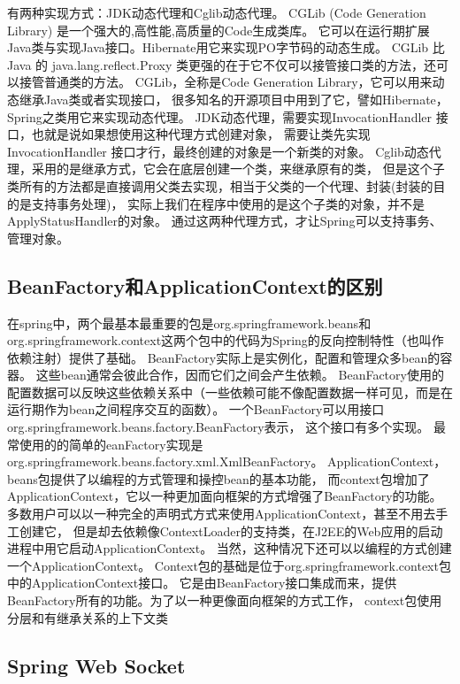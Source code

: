 \documentclass{book}
\begin{document}
有两种实现方式：JDK动态代理和Cglib动态代理。
CGLib (Code Generation Library) 是一个强大的,高性能,高质量的Code生成类库。
它可以在运行期扩展Java类与实现Java接口。Hibernate用它来实现PO字节码的动态生成。
CGLib 比 Java 的 java.lang.reflect.Proxy 类更强的在于它不仅可以接管接口类的方法，还可以接管普通类的方法。
CGLib，全称是Code Generation Library，它可以用来动态继承Java类或者实现接口，
很多知名的开源项目中用到了它，譬如Hibernate，Spring之类用它来实现动态代理。
JDK动态代理，需要实现InvocationHandler 接口，也就是说如果想使用这种代理方式创建对象，
需要让类先实现InvocationHandler 接口才行，最终创建的对象是一个新类的对象。
Cglib动态代理，采用的是继承方式，它会在底层创建一个类，来继承原有的类，
但是这个子类所有的方法都是直接调用父类去实现，相当于父类的一个代理、封装(封装的目的是支持事务处理)，
实际上我们在程序中使用的是这个子类的对象，并不是ApplyStatusHandler的对象。
通过这两种代理方式，才让Spring可以支持事务、管理对象。

\subsection{BeanFactory和ApplicationContext的区别}

在spring中，两个最基本最重要的包是org.springframework.beans和
org.springframework.context这两个包中的代码为Spring的反向控制特性（也叫作依赖注射）提供了基础。
BeanFactory实际上是实例化，配置和管理众多bean的容器。 
这些bean通常会彼此合作，因而它们之间会产生依赖。
BeanFactory使用的配置数据可以反映这些依赖关系中（一些依赖可能不像配置数据一样可见，而是在运行期作为bean之间程序交互的函数）。
一个BeanFactory可以用接口org.springframework.beans.factory.BeanFactory表示， 这个接口有多个实现。 最常使用的的简单的eanFactory实现是org.springframework.beans.factory.xml.XmlBeanFactory。
ApplicationContext，beans包提供了以编程的方式管理和操控bean的基本功能，
而context包增加了ApplicationContext，它以一种更加面向框架的方式增强了BeanFactory的功能。
多数用户可以以一种完全的声明式方式来使用ApplicationContext，甚至不用去手工创建它，
但是却去依赖像ContextLoader的支持类，在J2EE的Web应用的启动进程中用它启动ApplicationContext。
当然，这种情况下还可以以编程的方式创建一个ApplicationContext。
Context包的基础是位于org.springframework.context包中的ApplicationContext接口。
它是由BeanFactory接口集成而来，提供BeanFactory所有的功能。为了以一种更像面向框架的方式工作，
context包使用分层和有继承关系的上下文类

\subsection{Spring Web Socket}
\end{document}
